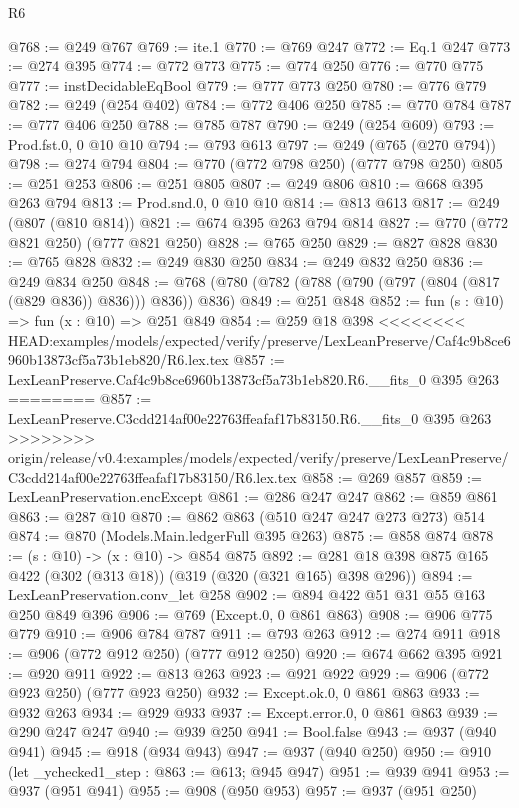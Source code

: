 \begin{lexlean}{R6}
\begin{coremodule}
{{{{{{{{{{{{{{{@768 := @249 @767
@769 := ite.{1}
@770 := @769 @247
@772 := Eq.{1} @247
@773 := @274 @395
@774 := @772 @773
@775 := @774 @250
@776 := @770 @775
@777 := instDecidableEqBool
@779 := @777 @773 @250
@780 := @776 @779
@782 := @249 (@254 @402)
@784 := @772 @406 @250
@785 := @770 @784
@787 := @777 @406 @250
@788 := @785 @787
@790 := @249 (@254 @609)
@793 := Prod.fst.{0, 0} @10 @10
@794 := @793 @613
@797 := @249 (@765 (@270 @794))
@798 := @274 @794
@804 := @770 (@772 @798 @250) (@777 @798 @250)
@805 := @251 @253
@806 := @251 @805
@807 := @249 @806
@810 := @668 @395 @263 @794
@813 := Prod.snd.{0, 0} @10 @10
@814 := @813 @613
@817 := @249 (@807 (@810 @814))
@821 := @674 @395 @263 @794 @814
@827 := @770 (@772 @821 @250) (@777 @821 @250)
@828 := @765 @250
@829 := @827 @828
@830 := @765 @828
@832 := @249 @830 @250
@834 := @249 @832 @250
@836 := @249 @834 @250
@848 := @768 (@780 (@782 (@788 (@790 (@797 (@804 (@817 (@829 @836)) @836))) @836)) @836)
@849 := @251 @848
@852 := fun (s : @10) => fun (x : @10) => @251 @849
@854 := @259 @18 @398
<<<<<<<< HEAD:examples/models/expected/verify/preserve/LexLeanPreserve/Caf4c9b8ce6960b13873cf5a73b1eb820/R6.lex.tex
@857 := LexLeanPreserve.Caf4c9b8ce6960b13873cf5a73b1eb820.R6.__fits_0 @395 @263
========
@857 := LexLeanPreserve.C3cdd214af00e22763ffeafaf17b83150.R6.__fits_0 @395 @263
>>>>>>>> origin/release/v0.4:examples/models/expected/verify/preserve/LexLeanPreserve/C3cdd214af00e22763ffeafaf17b83150/R6.lex.tex
@858 := @269 @857
@859 := LexLeanPreservation.encExcept
@861 := @286 @247 @247
@862 := @859 @861
@863 := @287 @10
@870 := @862 @863 (@510 @247 @247 @273 @273) @514
@874 := @870 (Models.Main.ledgerFull @395 @263)
@875 := @858 @874
@878 := (s : @10) -> (x : @10) -> @854 @875
@892 := @281 @18 @398 @875 @165 @422 (@302 (@313 @18)) (@319 (@320 (@321 @165) @398 @296))
@894 := LexLeanPreservation.conv_let @258
@902 := @894 @422 @51 @31 @55 @163 @250 @849 @396
@906 := @769 (Except.{0, 0} @861 @863)
@908 := @906 @775 @779
@910 := @906 @784 @787
@911 := @793 @263
@912 := @274 @911
@918 := @906 (@772 @912 @250) (@777 @912 @250)
@920 := @674 @662 @395
@921 := @920 @911
@922 := @813 @263
@923 := @921 @922
@929 := @906 (@772 @923 @250) (@777 @923 @250)
@932 := Except.ok.{0, 0} @861 @863
@933 := @932 @263
@934 := @929 @933
@937 := Except.error.{0, 0} @861 @863
@939 := @290 @247 @247
@940 := @939 @250
@941 := Bool.false
@943 := @937 (@940 @941)
@945 := @918 (@934 @943)
@947 := @937 (@940 @250)
@950 := @910 (let _ychecked1_step : @863 := @613; @945 @947)
@951 := @939 @941
@953 := @937 (@951 @941)
@955 := @908 (@950 @953)
@957 := @937 (@951 @250)
}}}}}}}}}}}}}}}
\end{coremodule}
\end{lexlean}
